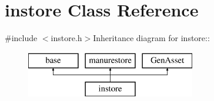 \hypertarget{classinstore}{
\section{instore Class Reference}
\label{classinstore}
}


{\ttfamily \#include $<$instore.h$>$}Inheritance diagram for instore::\begin{figure}[H]
\begin{center}
\leavevmode
\includegraphics[height=2cm]{classinstore}
\end{center}
\end{figure}

